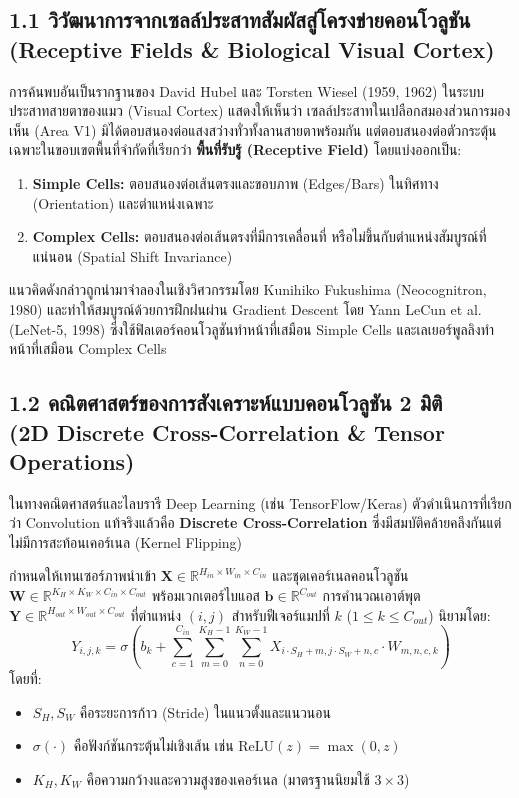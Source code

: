 \documentclass[12pt,a4paper]{article}
\begin{document}
\subsection*{1.1 วิวัฒนาการจากเซลล์ประสาทสัมผัสสู่โครงข่ายคอนโวลูชัน\\ \normalsize(Receptive Fields \& Biological Visual Cortex)}
การค้นพบอันเป็นรากฐานของ David Hubel และ Torsten Wiesel (1959, 1962)  ในระบบประสาทสายตาของแมว (Visual Cortex) แสดงให้เห็นว่า เซลล์ประสาทในเปลือกสมองส่วนการมองเห็น (Area V1) มิได้ตอบสนองต่อแสงสว่างทั่วทั้งลานสายตาพร้อมกัน แต่ตอบสนองต่อตัวกระตุ้นเฉพาะในขอบเขตพื้นที่จำกัดที่เรียกว่า \textbf{พื้นที่รับรู้ (Receptive Field)} โดยแบ่งออกเป็น:
\begin{enumerate}[leftmargin=1.8em, itemsep=1pt]
    \item \textbf{Simple Cells:} ตอบสนองต่อเส้นตรงและขอบภาพ (Edges/Bars) ในทิศทาง (Orientation) และตำแหน่งเฉพาะ
    \item \textbf{Complex Cells:} ตอบสนองต่อเส้นตรงที่มีการเคลื่อนที่ หรือไม่ขึ้นกับตำแหน่งสัมบูรณ์ที่แน่นอน (Spatial Shift Invariance)
\end{enumerate}
แนวคิดดังกล่าวถูกนำมาจำลองในเชิงวิศวกรรมโดย Kunihiko Fukushima (Neocognitron, 1980) และทำให้สมบูรณ์ด้วยการฝึกฝนผ่าน Gradient Descent โดย Yann LeCun et al. (LeNet-5, 1998) ซึ่งใช้ฟิลเตอร์คอนโวลูชันทำหน้าที่เสมือน Simple Cells และเลเยอร์พูลลิงทำหน้าที่เสมือน Complex Cells

\subsection*{1.2 คณิตศาสตร์ของการสังเคราะห์แบบคอนโวลูชัน 2 มิติ\\ \normalsize(2D Discrete Cross-Correlation \& Tensor Operations)}
ในทางคณิตศาสตร์และไลบรารี Deep Learning (เช่น TensorFlow/Keras) ตัวดำเนินการที่เรียกว่า Convolution แท้จริงแล้วคือ \textbf{Discrete Cross-Correlation} ซึ่งมีสมบัติคล้ายคลึงกันแต่ไม่มีการสะท้อนเคอร์เนล (Kernel Flipping) 

กำหนดให้เทนเซอร์ภาพนำเข้า $\mathbf{X} \in \mathbb{R}^{H_{in} \times W_{in} \times C_{in}}$ และชุดเคอร์เนลคอนโวลูชัน $\mathbf{W} \in \mathbb{R}^{K_H \times K_W \times C_{in} \times C_{out}}$ พร้อมเวกเตอร์ไบแอส $\mathbf{b} \in \mathbb{R}^{C_{out}}$ การคำนวณเอาต์พุต $\mathbf{Y} \in \mathbb{R}^{H_{out} \times W_{out} \times C_{out}}$ ที่ตำแหน่ง $(i, j)$ สำหรับฟีเจอร์แมปที่ $k$ ($1 \le k \le C_{out}$) นิยามโดย:
\begin{equation}
    Y_{i, j, k} = \sigma \left( b_k + \sum_{c=1}^{C_{in}} \sum_{m=0}^{K_H-1} \sum_{n=0}^{K_W-1} X_{i \cdot S_H + m, j \cdot S_W + n, c} \cdot W_{m, n, c, k} \right)
\end{equation}
โดยที่:
\begin{itemize}[leftmargin=1.8em, itemsep=1pt]
    \item $S_H, S_W$ คือระยะการก้าว (Stride) ในแนวตั้งและแนวนอน
    \item $\sigma(\cdot)$ คือฟังก์ชันกระตุ้นไม่เชิงเส้น เช่น $\text{ReLU}(z) = \max(0, z)$
    \item $K_H, K_W$ คือความกว้างและความสูงของเคอร์เนล (มาตรฐานนิยมใช้ $3 \times 3$)
\end{itemize}
\end{document}
